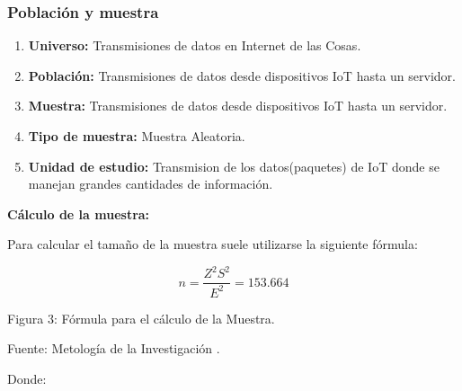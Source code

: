             \subsubsection{Población y muestra}    
                \vskip 0.3cm
                \begin{enumerate}
                    \item[]{{\bf Universo:} Transmisiones de datos en Internet de las Cosas.}
                    \item[]{{\bf Población:} Transmisiones de datos desde dispositivos IoT hasta un servidor.}
                    \item[]{{\bf Muestra:} Transmisiones de datos desde dispositivos IoT hasta un servidor.}
                    \item[]{{\bf Tipo de muestra:} Muestra Aleatoria.}
                    \item[]{{\bf Unidad de estudio:} Transmision de los datos(paquetes) de IoT donde se manejan grandes cantidades de información.}
                \end{enumerate}\par                 
                \vskip 0.3cm

                {\bf Cálculo de la muestra:}\par
                \vskip 0.3cm

                Para calcular el tamaño de la muestra suele utilizarse la siguiente fórmula:\par
                \begin{equation*}\label{}
                    n = \frac{Z^{2}S^{2}}{E^{2}} = 153.664
                \end{equation*}
                \begin{center}
                    { Figura 3: Fórmula para el cálculo de la Muestra.}\par
                    { Fuente: Metología de la Investigación {\cite{sampieri1997}}. }\par
                \end{center} 
                \vskip 0.3cm   

                Donde:
                \vskip 0.3cm

